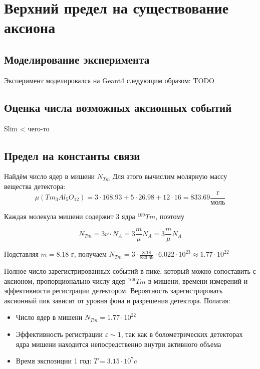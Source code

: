 \documentclass[a4paper,article,14pt]{extarticle}
\begin{document}
\section{Верхний предел на существование аксиона}

\subsection{Моделирование эксперимента}
Эксперимент моделировался на Geant4 следующим образом:
TODO
\subsection{Оценка числа возможных аксионных событий}
Slim < чего-то

\subsection{Предел на константы связи}
Найдём число ядер в мишени ${N_{Tm}}$ Для этого вычислим молярную массу вещества детектора:
\begin{equation}
    \mu \left( {T{m_3}A{l_5}{O_{12}}} \right) = 3 \cdot 168.93 + 5 \cdot 26.98 + 12 \cdot 16 = 833.69\frac{\text{г}}{{\text{моль}}}
\end{equation}

Каждая молекула мишени содержит 3 ядра $^{169}Tm$, поэтому

\begin{equation}
    N_{Tm} = 3\nu  \cdot {N_A} = 3\frac{m}{\mu }{N_A} = 3\frac{m}{\mu }{N_A}
\end{equation}

Подставляя $m=
8.18 \text{ г}$, получаем ${N_{Tm}} = 3 \cdot \frac{{8.18}}{{833.69}} \cdot 6.022 \cdot {10^{23}} \approx 1.77 \cdot {10^{22}}$


Полное число зарегистрированных событий в пике, который можно сопоставить с аксионом, пропорционально числу ядер $^{169}Tm$ в мишени, времени измерений и эффективности регистрации детектором. Вероятность зарегистрировать аксионный пик зависит от уровня фона и разрешения детектора. Полагая:
\begin{itemize}
    \item Число ядер в мишени $N_{Tm} = 1.77 \cdot {10^{22}}$
    \item Эффективность регистрации $\varepsilon \sim 1 $, так как в болометрических детекторах ядра мишени находится непосредственно внутри активного объема
    \item Время экспозиции 1 год: $T = 3.15 \cdot {10^7} c$
\end{itemize}
\end{document}
